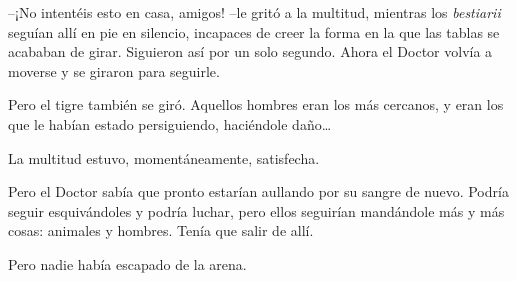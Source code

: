 --¡No intentéis esto en casa, amigos! --le gritó a la multitud, mientras
los \emph{bestiarii} seguían allí en pie en silencio, incapaces de creer
la forma en la que las tablas se acababan de girar. Siguieron así por un
solo segundo. Ahora el Doctor volvía a moverse y se giraron para
seguirle.

Pero el tigre también se giró. Aquellos hombres eran los más cercanos, y
eran los que le habían estado persiguiendo, haciéndole daño\ldots{}

La multitud estuvo, momentáneamente, satisfecha.

Pero el Doctor sabía que pronto estarían aullando por su sangre de
nuevo. Podría seguir esquivándoles y podría luchar, pero ellos seguirían
mandándole más y más cosas: animales y hombres. Tenía que salir de allí.

Pero nadie había escapado de la arena.
